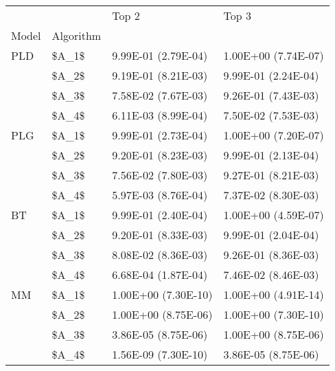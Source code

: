 \begin{tabular}{llll}
\toprule
   &       &                Top 2 &                Top 3 \\
Model & Algorithm &                      &                      \\
\midrule
PLD & \$A\_1\$ &  9.99E-01 (2.79E-04) &  1.00E+00 (7.74E-07) \\
   & \$A\_2\$ &  9.19E-01 (8.21E-03) &  9.99E-01 (2.24E-04) \\
   & \$A\_3\$ &  7.58E-02 (7.67E-03) &  9.26E-01 (7.43E-03) \\
   & \$A\_4\$ &  6.11E-03 (8.99E-04) &  7.50E-02 (7.53E-03) \\
PLG & \$A\_1\$ &  9.99E-01 (2.73E-04) &  1.00E+00 (7.20E-07) \\
   & \$A\_2\$ &  9.20E-01 (8.23E-03) &  9.99E-01 (2.13E-04) \\
   & \$A\_3\$ &  7.56E-02 (7.80E-03) &  9.27E-01 (8.21E-03) \\
   & \$A\_4\$ &  5.97E-03 (8.76E-04) &  7.37E-02 (8.30E-03) \\
BT & \$A\_1\$ &  9.99E-01 (2.40E-04) &  1.00E+00 (4.59E-07) \\
   & \$A\_2\$ &  9.20E-01 (8.33E-03) &  9.99E-01 (2.04E-04) \\
   & \$A\_3\$ &  8.08E-02 (8.36E-03) &  9.26E-01 (8.36E-03) \\
   & \$A\_4\$ &  6.68E-04 (1.87E-04) &  7.46E-02 (8.46E-03) \\
MM & \$A\_1\$ &  1.00E+00 (7.30E-10) &  1.00E+00 (4.91E-14) \\
   & \$A\_2\$ &  1.00E+00 (8.75E-06) &  1.00E+00 (7.30E-10) \\
   & \$A\_3\$ &  3.86E-05 (8.75E-06) &  1.00E+00 (8.75E-06) \\
   & \$A\_4\$ &  1.56E-09 (7.30E-10) &  3.86E-05 (8.75E-06) \\
\bottomrule
\end{tabular}
